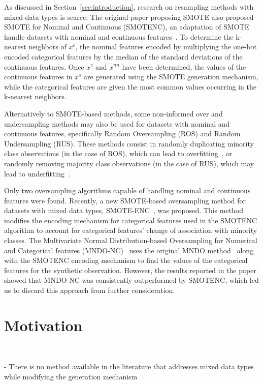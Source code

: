\documentclass[parskip=full]{scrartcl}
\begin{document}
As discussed in Section~\ref{sec:introduction}, research on resampling methods
with mixed data types is scarce. The original paper proposing SMOTE also
proposed SMOTE for Nominal and Continuous (SMOTENC), an adaptation of SMOTE
handle datasets with nominal and continuous features~\cite{Chawla2002}. To
determine the k-nearest neighbors of $x^c$, the nominal features encoded by
multiplying the one-hot encoded categorical features by the median of the
standard deviations of the continuous features. Once $x^c$ and $x^{nn}$ have
been determined, the values of the continuous features in $x^s$ are generated
using the SMOTE generation mechanism, while the categorical features are given
the most common values occurring in the k-nearest neighbors.

Alternatively to SMOTE-based methods, some non-informed over and undersampling
methods may also be used for datasets with nominal and continuous features,
specifically Random Oversampling (ROS) and Random Undersampling (RUS). These
methods consist in randomly duplicating minority class observations (in the
case of ROS), which can lead to overfitting~\cite{park2021combined,
batista2004study}, or randomly removing majority class observations (in the
case of RUS), which may lead to underfitting~\cite{bansal2021analysis}.

Only two oversampling algorithms capable of handling nominal and continuous
features were found. Recently, a new SMOTE-based oversampling method for
datasets with mixed data types, SMOTE-ENC~\cite{mukherjee2021smote}, was
proposed. This method modifies the encoding mechanism for categorical features
used in the SMOTENC algorithm to account for categorical features' change of
association with minority classes. The Multivariate Normal Distribution-based
Oversampling for Numerical and Categorical features
(MNDO-NC)~\cite{ambai2019multivariate} uses the original MNDO
method~\cite{ambai2018mndo} along with the SMOTENC encoding mechanism to find
the values of the categorical features for the synthetic observation. However,
the results reported in the paper showed that MNDO-NC was consistently
outperformed by SMOTENC, which led us to discard this approach from further
consideration.

\section{Motivation}~\label{sec:motivation}

- There is no method available in the literature that addresses mixed data
  types while modifying the generation mechanism
\end{document}
